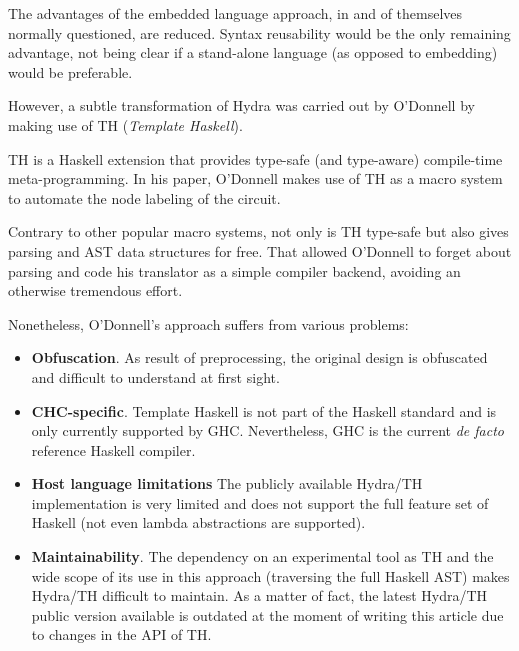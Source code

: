 \documentclass[a4paper,twoside,11pt]{article}
\begin{document}
\begin{body}
  The advantages of the embedded language approach, in and of themselves
  normally questioned\cite{another}, are reduced.
  Syntax reusability would be the only remaining advantage, not being
  clear if a stand-alone language (as opposed to embedding) would be
  preferable.
  
  However, a subtle transformation of Hydra was carried out
  by O'Donnell \cite{hydra:th} by making use of TH (\textit{Template
    Haskell}).
  
  TH\cite{metahaskell} is a Haskell extension that provides type-safe
  (and type-aware) compile-time meta-programming. In his paper,
  O'Donnell makes use of TH as a macro system to automate the node
  labeling of the circuit.
  
  Contrary to other popular macro systems, not only is TH type-safe but
  also gives parsing and AST data structures for free. That allowed
  O'Donnell to forget about parsing and code his translator as a simple
  compiler backend, avoiding an otherwise tremendous effort.
  
  Nonetheless, O'Donnell's approach suffers from various problems:
  
  \begin{itemize}
    
  \item \textbf{Obfuscation}. As result of preprocessing, the original
    design is obfuscated and difficult to understand at first sight.
    
  \item \textbf{CHC-specific}. Template Haskell is not part of the
    Haskell standard\cite{haskell} and is only currently supported by
    GHC. Nevertheless, GHC is the
    current \textit{de facto} reference Haskell compiler.
    
  \item \textbf{Host language limitations} The publicly available
    Hydra/TH implementation is very limited and does not support the
    full feature set of Haskell (not even lambda abstractions are supported).
    
  \item \textbf{Maintainability}. The dependency on an experimental
    tool as TH and the wide scope of its use in this approach
    (traversing the full Haskell AST) makes Hydra/TH difficult to
    maintain. As a matter of fact, the latest Hydra/TH public version
    available is outdated at the moment of writing this article due to
    changes in the API of TH.
  \end{itemize}
  

\end{body}
\end{document}
